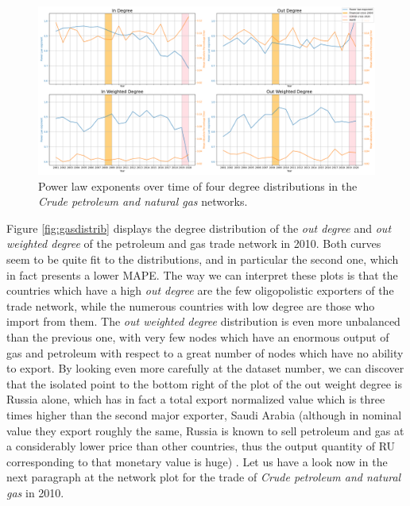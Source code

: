 \begin{figure}
    \centering
    \includegraphics[width=\textwidth]{pics/ts_p06.png}
    \caption{Power law exponents over time of four degree distributions in the \textit{Crude petroleum and natural gas} networks.}
    \label{fig:gasdegree}
\end{figure}

Figure \ref{fig:gasdistrib} displays the degree distribution of the \textit{out degree} and \textit{out weighted degree} of the petroleum and gas trade network in 2010. Both curves seem to be quite fit to the distributions, and in particular the second one, which in fact presents a lower MAPE. The way we can interpret these plots is that the countries which have a high \textit{out degree} are the few oligopolistic exporters of the trade network, while the numerous countries with low degree are those who import from them. The \textit{out weighted degree} distribution is even more unbalanced than the previous one, with very few nodes which have an enormous output of gas and petroleum with respect to a great number of nodes which have no ability to export. By looking even more carefully at the dataset number, we can discover that the isolated point to the bottom right of the plot of the out weight degree is Russia alone, which has in fact a total export normalized value which is three times higher than the second major exporter, Saudi Arabia (although in nominal value they export roughly the same, Russia is known to sell petroleum and gas at a considerably lower price than other countries, thus the output quantity of RU corresponding to that monetary value is huge) \cite{trent2020opec}.
Let us have a look now in the next paragraph at the network plot for the trade of \textit{Crude petroleum and natural gas} in 2010.

